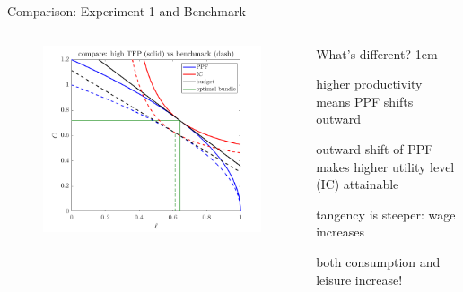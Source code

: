 \documentclass[11pt,aspectratio=43]{beamer}
\let\olditemize=\itemize
\let\endolditemize=\enditemize
\renewenvironment{itemize}{\olditemize \itemsep1em}{\endolditemize}
\theoremstyle{definition}
\begin{document}
\begin{frame}{Comparison: Experiment 1 and Benchmark}
\label{slide:Comparison__Experiment_1_and_Benchmark}
\begin{columns}
    \begin{column}{0.5\textwidth}
        \begin{figure}
            \includegraphics[width=\textwidth]{./figures/Exp1BenchmarkCompare.png}
        \end{figure}
    \end{column}
    \begin{column}{0.5\textwidth}
        What’s different?
        \begin{itemize}
            \item higher productivity means PPF shifts outward
            \item outward shift of PPF makes higher utility level (IC) attainable
            \item tangency is steeper: wage increases
            \item both consumption and leisure increase!
        \end{itemize}
    \end{column}
\end{columns}
\end{frame}
\end{document}
